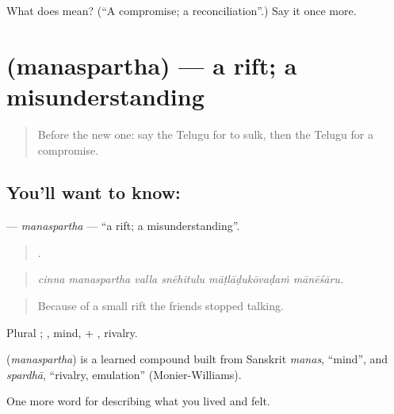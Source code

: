 \begin{tcolorbox}[breakable,colback=teal!4,colframe=teal!35!black,title={Before you move on}]
What does  mean? (\textquotedblleft{}A compromise; a reconciliation\textquotedblright{}.) Say it once more.
\end{tcolorbox}
\section[\texorpdfstring{\te{మనస్పర్థ} (manaspartha)}{మనస్పర్థ (manaspartha)}]{ (manaspartha) — a rift; a misunderstanding}

\label{lesson:TE-C534-manaspartha}



\begin{quote}
Before the new one: say the Telugu for to sulk, then the Telugu for a compromise.
\end{quote}

\subsection*{You'll want to know: }
\textbf{} — \emph{manaspartha} — \textquotedblleft{}a rift; a misunderstanding\textquotedblright{}.

\begin{quote}
     .
\end{quote}

\begin{quote}
\emph{cinna manaspartha valla snēhitulu māṭlāḍukōvaḍaṁ mānēśāru.}
\end{quote}

\begin{quote}
Because of a small rift the friends stopped talking.
\end{quote}

Plural ; , mind, + , rivalry.

\begin{cousinweb}
\textbf{} (\emph{manaspartha}) is a learned compound built from Sanskrit \emph{manas}, \textquotedblleft{}mind\textquotedblright{}, and \emph{spardhā}, \textquotedblleft{}rivalry, emulation\textquotedblright{} (Monier-Williams).
\end{cousinweb}

\begin{grammarlens}[title={What you've built}]
One more word for describing what you lived and felt.
\end{grammarlens}


